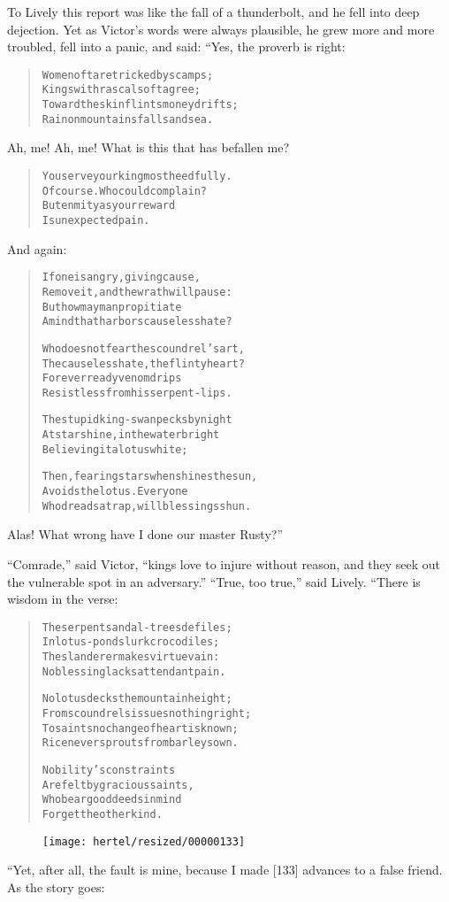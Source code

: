\documentclass[article, twoside, 10pt]{memoir}
\renewenvironment{verbatim}{%
\begin{quote}%
\vskip -10pt%
\begin{alltt}\normalfont\small}{\end{alltt}%
\end{quote}%
\vskip -10pt
} %
\begin{document}
To Lively this report was like the fall of a thunderbolt, and he
fell into deep dejection. Yet as Victor's words were always
plausible, he grew more and more troubled, fell into a panic, and
said: “Yes, the proverb is right:

\begin{verbatim}
Women oft are tricked by scamps;
    Kings with rascals oft agree;
Toward the skinflints money drifts;
    Rain on mountains falls and sea.
\end{verbatim}
Ah, me! Ah, me! What is this that has befallen me?

\begin{verbatim}
You serve your king most heedfully.
    Of course. Who could complain?
But enmity as your reward
    Is unexpected pain.
\end{verbatim}
And again:

\begin{verbatim}
If one is angry, giving cause,
Remove it, and the wrath will pause:
But how may man propitiate
A mind that harbors causeless hate?

Who does not fear the scoundrel's art,
The causeless hate, the flinty heart?
For ever ready venom drips
Resistless from his serpent-lips.

The stupid king-swan pecks by night
At starshine, in the water bright
Believing it a lotus white;

Then, fearing stars when shines the sun,
Avoids the lotus. Everyone
Who dreads a trap, will blessings shun.
\end{verbatim}
Alas! What wrong have I done our master Rusty?”

``Comrade,'' said Victor,
``kings love to injure without reason, and they seek out the vulnerable spot in an adversary.''
``True, too true,'' said Lively. “There is wisdom in the verse:

\begin{verbatim}
The serpent sandal-trees defiles;
In lotus-ponds lurk crocodiles;
The slanderer makes virtue vain:
No blessing lacks attendant pain.

No lotus decks the mountain height;
From scoundrels issues nothing right;
To saints no change of heart is known;
Rice never sprouts from barley sown.

Nobility's constraints
Are felt by gracious saints,
Who bear good deeds in mind
Forget the other kind.
\end{verbatim}
\begin{figure}[p]\texttt{[image: hertel/resized/00000133]}\end{figure}“Yet, after all, the fault is mine, because I made [133] advances
to a false friend. As the story goes:
\end{document}
